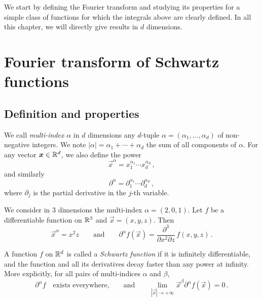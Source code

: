 We start by defining the Fourier transform and studying its properties for a simple class
of functions for which the integrals above are clearly defined. In all this chapter, we
will directly give results in $d$ dimensions.
\section{Fourier transform of Schwartz functions}
\subsection{Definition and properties}
\begin{definition}
  We call \emph{multi-index} $\alpha$ in $d$ dimensions any $d$-tuple
  $\alpha=(\alpha_1,\dots,\alpha_d)$ of  non-negative integers. We note
  $|\alpha|=\alpha_1+\cdots+\alpha_d$ the sum of all components of $\alpha$.
  For any vector $\bm{x}\in\mathbb{R}^d$, we also define the power
  \begin{equation}
    \vec{x}^\alpha=x_1^{\alpha_1}\cdots x_d^{\alpha_d}\,,
  \end{equation}
  and similarly
  \begin{equation}
    \partial^{\alpha}=\partial_1^{\alpha_1}\cdots\partial_d^{\alpha_d}\,,
  \end{equation}
  where $\partial_j$ is the partial derivative in the $j$-th variable.
\end{definition}
\begin{example}
  We consider in $3$ dimensions the multi-index $\alpha=(2,0,1)$. Let $f$ be a
  differentiable function on $\mathbb{R}^3$ and $\vec{x}=(x,y,z)$. Then
  \begin{equation}
    \vec{x}^\alpha=x^2z\qquad\text{and}\qquad\partial^\alpha
    f(\vec{x})=\frac{\partial^3}{\partial x^2\partial z}\,f(x,y,z)\,.
  \end{equation}
\end{example}
\begin{definition}
  \label{def:schwartz-fn}
  A function $f$ on $\mathbb{R}^d$ is called a \emph{Schwartz function} if it is infinitely
  differentiable, and the function and all its derivatives decay faster than any power
  at infinity. More explicitly, for all pairs of multi-indices $\alpha$ and $\beta$,
  \begin{equation}
    \partial^{\alpha}f\quad\text{exists everywhere,}\qquad\text{and}\qquad
    \lim_{|\vec{x}|\to+\infty}\vec{x}^\beta\partial^{\alpha}f(\vec{x})=0\,.
  \end{equation}
\end{definition}
